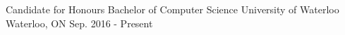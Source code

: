 \begin{cventries}
  \cventry
    {Candidate for Honours Bachelor of Computer Science}
    {University of Waterloo}
    {Waterloo, ON}
    {Sep. 2016 - Present}
    {}
\end{cventries}
